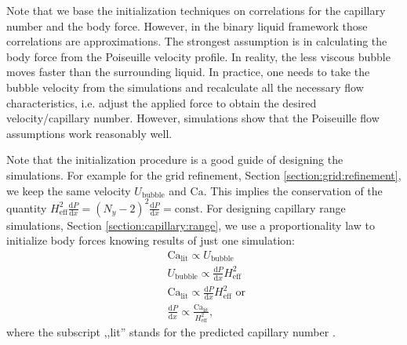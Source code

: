 \documentclass[preprint,12pt]{elsarticle}
\newcommand{\Ca}{\mathrm{Ca}}
\begin{document}
Note that we base the initialization techniques on correlations for the
capillary number and the body force. However, in the binary liquid framework
those correlations are approximations. The strongest assumption is
in calculating the body force from the Poiseuille velocity profile.
In reality, the less viscous bubble moves faster than the surrounding liquid.  In practice, one
needs to take the bubble velocity from the
simulations and
recalculate all the necessary flow characteristics, i.e. adjust the
 applied force to obtain the desired velocity/capillary number. However, simulations show that the
Poiseuille flow assumptions work reasonably well.

{\color{red}
Note that the initialization procedure is a good guide of designing the simulations. For example
for the grid refinement, Section \ref{section:grid:refinement}, we keep the same velocity
$U_{\mathrm{bubble}}$ and $\Ca$. This implies the conservation of the quantity
$H_{\mathrm{eff}}^2\frac{\mathrm{d}P}{\mathrm{d}x}=(N_y-2)^2\frac{\mathrm{d}P}{\mathrm{d}
x } = \mathrm{const}$. For designing capillary range simulations, Section
\ref{section:capillary:range}, we use a proportionality law to initialize body forces knowing
results of just one simulation:
\begin{equation}
\begin{aligned}
&\Ca_{\mathrm{lit}} \propto U_{\mathrm{bubble}}\\
&U_{\mathrm{bubble}} \propto \frac{\mathrm{d}P}{\mathrm{d}x} H_{\mathrm{eff}}^2\\
&\Ca_{\mathrm{lit}} \propto \frac{\mathrm{d}P}{\mathrm{d} x} H_{\mathrm{eff}}^2 \text{ or }\\
&\frac{\mathrm{d}P}{\mathrm{d} x} \propto \frac{\Ca_{\mathrm{lit}}}{H_{\mathrm{eff}}^2},
\end{aligned}
\end{equation}
where the subscript ,,lit'' stands for the predicted capillary number
\cite{giavedoni-numerical,heil-bretherton}. 
}
\end{document}
